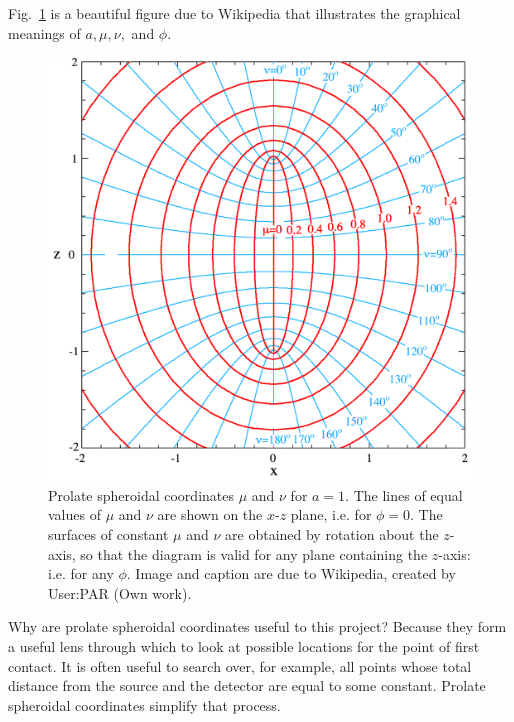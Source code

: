 \documentclass[11pt]{article}
\begin{document}
Fig.~\ref{fig:spheroidcoord} is a beautiful figure due to Wikipedia that illustrates the graphical meanings of $a, \mu, \nu,$ and $\phi$. 

\begin{figure}
\begin{center}
\centering
\includegraphics[scale=0.3]{figs/spheroidcoord.png}
\caption{Prolate spheroidal coordinates $\mu$ and $\nu$ for $a=1$. The lines of equal values of $\mu$ and $\nu$ are shown on the $x$-$z$ plane, i.e. for $\phi=0$. The surfaces of constant $\mu$ and $\nu$ are obtained by rotation about the $z$-axis, so that the diagram is valid for any plane containing the $z$-axis: i.e. for any $\phi$. Image and caption are due to Wikipedia, created by User:PAR (Own work). \label{fig:spheroidcoord}}
\end{center}
\end{figure}

Why are prolate spheroidal coordinates useful to this project? Because they form a useful lens through which to look at possible locations for the point of first contact. It is often useful to search over, for example, all points whose total distance from the source and the detector are equal to some constant. Prolate spheroidal coordinates simplify that process.
\end{document}

